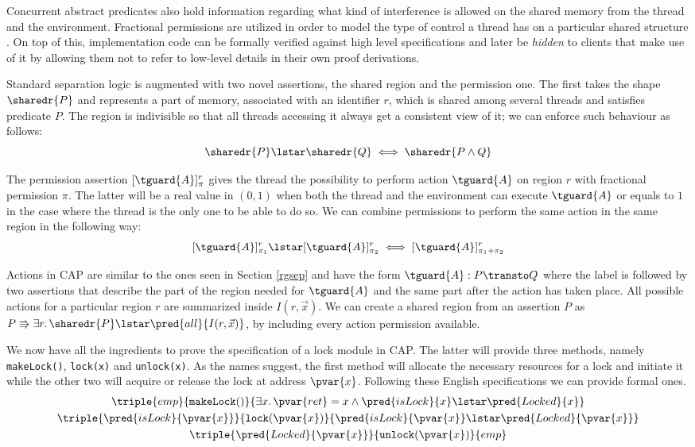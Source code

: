 Concurrent abstract predicates also hold information regarding what kind of interference is allowed on the shared memory from the thread and the environment. Fractional permissions are utilized in order to model the type of control a thread has on a particular shared structure \cite{fractional}. On top of this, implementation code can be formally verified against high level specifications and later be \textit{hidden} to clients that make use of it by allowing them not to refer to low-level details in their own proof derivations.

Standard separation logic is augmented with two novel assertions, the shared region and the permission one. The first takes the shape $\sharedr{P}$ and represents a part of memory, associated with an identifier $r$, which is shared among several threads and satisfies predicate $P$. The region is indivisible so that all threads accessing it always get a consistent view of it; we can enforce such behaviour as follows:
\[
	\sharedr{P} \lstar \sharedr{Q} \iff \sharedr{P \land Q}
\]

The permission assertion $[\tguard{A}]_\pi^r$ gives the thread the possibility to perform action $\tguard{A}$ on region $r$ with fractional permission $\pi$. The latter will be a real value in $(0, 1)$ when both the thread and the environment can execute $\tguard{A}$ or equals to $1$ in the case where the thread is the only one to be able to do so. We can combine permissions to perform the same action in the same region in the following way:
\[
	[\tguard{A}]_{\pi_1}^r \lstar [\tguard{A}]_{\pi_2}^r \iff [\tguard{A}]_{\pi_1 + \pi_2}^r
\]

Actions in CAP are similar to the ones seen in Section \ref{rgsep} and have the form $\tguard{A}: P \transto Q$ where the label is followed by two assertions that describe the part of the region needed for $\tguard{A}$ and the same part after the action has taken place. All possible actions for a particular region $r$ are summarized inside $I(r, \vec{x})$. We can create a shared region from an assertion $P$ as $P \Rrightarrow \exists r \ldotp \sharedr{P} \lstar \pred{all}{I(r, \vec{x})}$, by including every action permission available.

We now have all the ingredients to prove the specification \cite{cap} of a lock module in CAP. The latter will provide three methods, namely \texttt{makeLock()}, \texttt{lock(x)} and \texttt{unlock(x)}. As the names suggest, the first method will allocate the necessary resources for a lock and initiate it while the other two will acquire or release the lock at address $\pvar{x}$. Following these English specifications we can provide formal ones.
\begin{gather*}
\triple
{emp}
{\mathtt{makeLock}()}
{\exists x \ldotp \pvar{ret} = x \land \pred{isLock}{x} \lstar \pred{Locked}{x}}
\\
\triple
{\pred{isLock}{\pvar{x}}}
{\mathtt{lock}(\pvar{x})}
{\pred{isLock}{\pvar{x}} \lstar \pred{Locked}{\pvar{x}}}
\\
\triple
{\pred{Locked}{\pvar{x}}}
{\mathtt{unlock}(\pvar{x})}
{emp}
\end{gather*}

